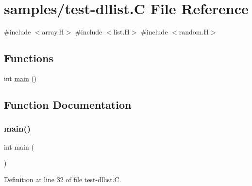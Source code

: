 \hypertarget{test-dllist_8_c}{}\section{samples/test-\/dllist.C File Reference}
\label{test-dllist_8_c}
{\ttfamily \#include $<$array.\+H$>$}\newline
{\ttfamily \#include $<$list.\+H$>$}\newline
{\ttfamily \#include $<$random.\+H$>$}\newline
\subsection*{Functions}
\begin{DoxyCompactItemize}
\item 
int \hyperlink{test-dllist_8_c_ae66f6b31b5ad750f1fe042a706a4e3d4}{main} ()
\end{DoxyCompactItemize}


\subsection{Function Documentation}
\mbox{\label{test-dllist_8_c_ae66f6b31b5ad750f1fe042a706a4e3d4}} 
\subsubsection{\texorpdfstring{main()}{main()}}
{\footnotesize\ttfamily int main (\begin{DoxyParamCaption}{ }\end{DoxyParamCaption})}



Definition at line 32 of file test-\/dllist.\+C.

